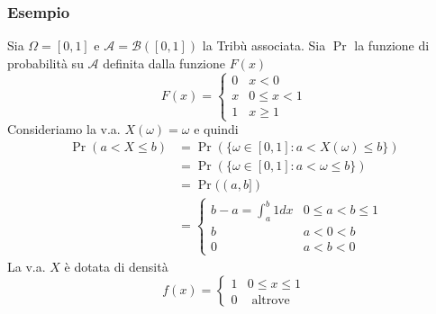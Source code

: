 \subsubsection*{Esempio} Sia $\Omega=[0,1]$ e $\mathcal{A}=\mathcal{B}([0,1])$ la Tribù associata. Sia $\Pr$ la funzione di probabilità su $\mathcal{A}$ definita dalla funzione $F(x)$
\[
	F(x)= \begin{cases}0 & x<0 \\ x & 0 \leq x<1 \\ 1 & x \geq 1\end{cases}
\]
Consideriamo la v.a. $X(\omega)=\omega$ e quindi
\[
	\begin{aligned}
		\Pr(a<X \leq b) & =\Pr(\{\omega \in[0,1]: a<X(\omega) \leq b\})         \\
		                & =\Pr(\{\omega \in[0,1]: a<\omega \leq b\})            \\
		                & =\Pr((a, b])                                          \\
		                & = \begin{cases}b-a=\int_a^b 1 d x & 0 \leq a<b \leq 1 \\
             b                  & a<0<b             \\
             0                  & a<b<0\end{cases}
	\end{aligned}
\]
La v.a. $X$ è dotata di densità
\[
	f(x)= \begin{cases}1 & 0 \leq x \leq 1 \\ 0 & \text { altrove }\end{cases}
\]

